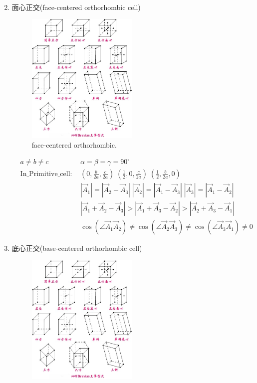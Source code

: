 \documentclass{article}      %
\begin{document}
\begin{enumerate}
\begin{displaymath}
\begin{aligned}
	\end{aligned}
\end{displaymath}
		\item 面心正交(\textrm{face-centered orthorhombic cell})
\begin{figure}[h!]
\centering
\includegraphics[width=0.5\textwidth,viewport=370 330 500 460,clip]{Bravias.jpg}
\caption{\small face-centered orthorhombic.}%
\label{Bravais:orthorhombic-face-centered}
\end{figure}
\begin{displaymath}
	\begin{aligned}
	&a\neq b\neq c &\alpha=\beta=\gamma=90^{\circ} \\
	&\mathrm{In\_Primitive\_cell}:~&(0,\frac{b}{2a},\frac{c}{2a})\;(\frac12,0,\frac{c}{2a})\;(\frac12,\frac{b}{2a},0)\\
	& & |\vec A_1|=|\vec A_2-\vec A_3|\;|\vec A_2|=|\vec A_1-\vec A_3|\;|\vec A_3|=|\vec A_1-\vec A_2|\\
	& &|\vec A_1+\vec A_2-\vec A_3|>|\vec A_1+\vec A_3-\vec A_2|>|\vec A_2+\vec A_3-\vec A_1|\\
		& &\cos(\angle\vec A_1\vec A_2)\neq\cos(\angle\vec A_2\vec A_3)\neq\cos(\angle\vec A_3\vec A_1)\neq0
	\end{aligned}
\end{displaymath}
		\item 底心正交(\textrm{base-centered orthorhombic cell})
\begin{figure}[h!]
\centering
\includegraphics[width=0.5\textwidth,viewport=250 330 370 460,clip]{Bravias.jpg}

\end{figure}
\end{enumerate}
\end{document}
